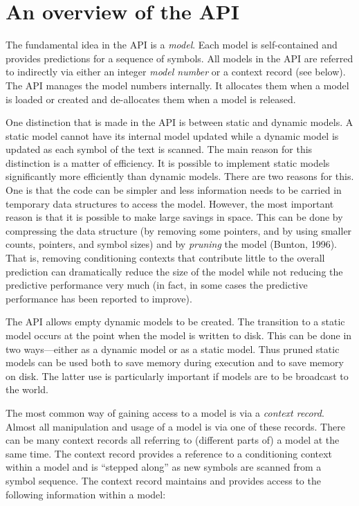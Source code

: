 \documentclass[11pt]{article}
\begin{document}
\section{An overview of the API}

The fundamental idea in the API is a {\em model}. Each model is self-contained and
provides predictions for a sequence of symbols. All models in the API are
referred to indirectly via either an integer \emph{model number} or a context
record (see below). The API manages the model numbers internally. It allocates them when a model
is loaded or created and de-allocates them when a model is released.

One distinction that is made in the API is between static and dynamic
models. A static model cannot have its internal model updated while a
dynamic model is updated as each symbol of the text is scanned. The main
reason for this distinction is a matter of efficiency. It is possible to
implement static models significantly more efficiently than dynamic models.
There are two reasons for this. One is that the code can be simpler and less
information needs to be carried in temporary data structures to access the
model. However, the most important reason is that it is possible to make
large savings in space. This can be done by compressing the data structure
(by removing some pointers, and by using smaller counts, pointers, and
symbol sizes) and by \emph{pruning} the model (Bunton, 1996).
That is, removing conditioning contexts that contribute little to the
overall prediction can dramatically reduce the size of the model while not
reducing the predictive performance very much (in fact, in some cases the
predictive performance has been reported to improve).

The API allows empty dynamic models to be created. The transition to a
static model occurs at the point when the model is written to disk. This can
be done in two ways---either as a dynamic model or as a static model. Thus
pruned static models can be used both to save memory during execution and to
save memory on disk. The latter use is particularly important if models are
to be broadcast to the world.

The most common way of gaining access to a model is via a \emph{context
record}. Almost all manipulation and usage of a model is via one of these
records. There can be many context records all referring to (different parts
of) a model at the same time. The context record provides a reference to a
conditioning context within a model and is ``stepped along'' as new symbols
are scanned from a symbol sequence. The context record maintains and
provides access to the following information within a model:
\end{document}
